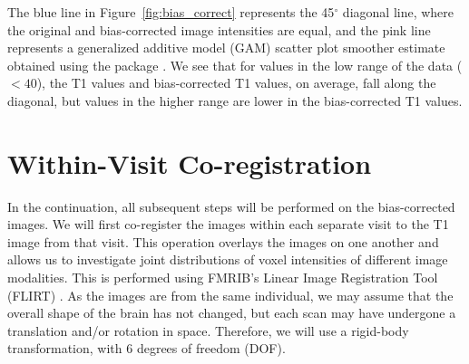 \documentclass[a4paper]{report}\usepackage[]{graphicx}\usepackage[]{color}
\makeatletter
\newcommand{\CRANpkg}[1]{\href{http://CRAN.R-project.org/package=#1}{\pkg{#1}}}%
\let\pkg=\strong
\DeclareRobustCommand\code{\bgroup\@noligs\@codex}
\makeatother
\begin{document}
\begin{article}
The blue line in Figure~\ref{fig:bias_correct}\protect{} represents the 45$^{\circ}$ diagonal line, where the original and bias-corrected image intensities are equal, and the pink line represents a generalized additive model (GAM) \citep{hastie_generalized_1990} scatter plot smoother estimate obtained using the \CRANpkg{mgcv} package \citep{wood_fast_2011}.  We see that for values in the low range of the data ($< 40$), the T1 values and bias-corrected T1 values, on average, fall along the diagonal, but values in the higher range are lower in the bias-corrected T1 values.






\section{Within-Visit Co-registration}
In the continuation, all subsequent steps will be performed on the bias-corrected images.  We will first co-register the images within each separate visit to the T1 image from that visit.  This operation overlays the images on one another and allows us to investigate joint distributions of voxel intensities of different image modalities.  This is performed using FMRIB's Linear Image Registration Tool (FLIRT) \citep{jenkinson_global_2001, jenkinson_improved_2002}.  As the images are from the same individual, we may assume that the overall shape of the brain has not changed, but each scan may have undergone a translation and/or rotation in space.  Therefore, we will use a rigid-body transformation, with $6$ degrees of freedom (DOF).  








\end{article}
\end{document}
